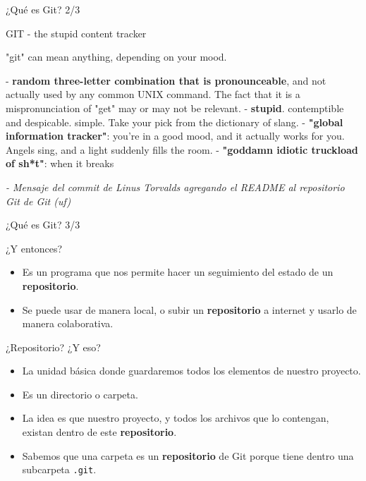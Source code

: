 \begin{frame}{¿Qué es Git? 2/3}
    \begin{center}
        \begin{block}{GIT - the stupid content tracker}

            "git" can mean anything, depending on your mood.
            
             - \textbf{random three-letter combination that is pronounceable}, and not actually used by any common UNIX command.  The fact that it is a mispronunciation of "get" may or may not be relevant.\newline
             - \textbf{stupid}. contemptible and despicable. simple. Take your pick from the dictionary of slang.\newline
             - \textbf{"global information tracker"}: you're in a good mood, and it actually works for you. Angels sing, and a light suddenly fills the room. \newline
             - \textbf{"goddamn idiotic truckload of sh*t"}: when it breaks
        \end{block}
    \end{center}
    \pause
    \textit{ - Mensaje del commit de Linus Torvalds agregando el README al repositorio Git de Git (uf)}
    
\end{frame}


\begin{frame}{¿Qué es Git? 3/3}
\begin{center}
    \begin{block} {¿Y entonces?}
        \begin{itemize}
            \item Es un programa que nos permite hacer un seguimiento del estado de un \textbf{repositorio}.
            \pause
            \item Se puede usar de manera local, o subir un \textbf{repositorio} a internet y usarlo de manera colaborativa. 
        \end{itemize}
    \end{block}
\end{center}
\pause
    \begin{block}{¿Repositorio? ¿Y eso?}
    \begin{itemize}
        \pause
        \item La unidad básica donde guardaremos todos los elementos de nuestro proyecto.
        \pause
        \item Es un directorio o carpeta.
        \pause
        \item La idea es que nuestro proyecto, y todos los archivos que lo contengan, existan dentro de este \textbf{repositorio}.
        \pause
        \item Sabemos que una carpeta es un \textbf{repositorio} de Git porque tiene dentro una subcarpeta \texttt{.git}.
    \end{itemize}

    \end{block}
    
\end{frame}

